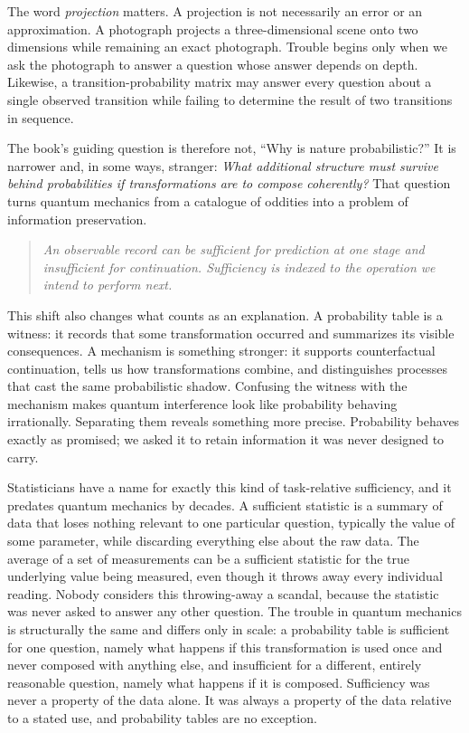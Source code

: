 \documentclass[12pt,openany]{book}
\newenvironment{turningpoint}{\begin{quote}\small\itshape}{\end{quote}}
\begin{document}
The word \emph{projection} matters. A projection is not necessarily an error or an approximation. A photograph projects a three-dimensional scene onto two dimensions while remaining an exact photograph. Trouble begins only when we ask the photograph to answer a question whose answer depends on depth. Likewise, a transition-probability matrix may answer every question about a single observed transition while failing to determine the result of two transitions in sequence.

The book's guiding question is therefore not, ``Why is nature probabilistic?'' It is narrower and, in some ways, stranger: \emph{What additional structure must survive behind probabilities if transformations are to compose coherently?} That question turns quantum mechanics from a catalogue of oddities into a problem of information preservation.

\begin{turningpoint}
An observable record can be sufficient for prediction at one stage and insufficient for continuation. Sufficiency is indexed to the operation we intend to perform next.
\end{turningpoint}

This shift also changes what counts as an explanation. A probability table is a witness: it records that some transformation occurred and summarizes its visible consequences. A mechanism is something stronger: it supports counterfactual continuation, tells us how transformations combine, and distinguishes processes that cast the same probabilistic shadow. Confusing the witness with the mechanism makes quantum interference look like probability behaving irrationally. Separating them reveals something more precise. Probability behaves exactly as promised; we asked it to retain information it was never designed to carry.

Statisticians have a name for exactly this kind of task-relative sufficiency, and it predates quantum mechanics by decades. A sufficient statistic is a summary of data that loses nothing relevant to one particular question, typically the value of some parameter, while discarding everything else about the raw data. The average of a set of measurements can be a sufficient statistic for the true underlying value being measured, even though it throws away every individual reading. Nobody considers this throwing-away a scandal, because the statistic was never asked to answer any other question. The trouble in quantum mechanics is structurally the same and differs only in scale: a probability table is sufficient for one question, namely what happens if this transformation is used once and never composed with anything else, and insufficient for a different, entirely reasonable question, namely what happens if it is composed. Sufficiency was never a property of the data alone. It was always a property of the data relative to a stated use, and probability tables are no exception.
\end{document}
